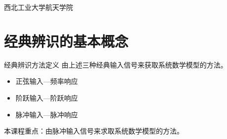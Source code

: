 
\newcommand{\vect}[1]{\boldsymbol{#1}}

\def\lecturename{系统辨识}

\title{\insertlecture}

\author{邢超}

\institute
{
  西北工业大学航天学院
}


\subtitle{}
\date{2012}



\begin{frame}
  \maketitle
\end{frame}


\section{经典辨识的基本概念}


\begin{frame}{经典辨识方法定义}
由上述三种经典输入信号来获取系统数学模型的方法。
\begin{itemize}
\item 正弦输入—频率响应%
\item 阶跃输入—阶跃响应%
\item 脉冲输入—脉冲响应%
\end{itemize}
本课程重点：由脉冲输入信号来求取系统数学模型的方法。
\end{frame}

